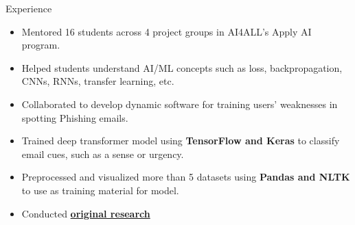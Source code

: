 \documentclass{resume} %
\begin{document}
\begin{workSection}{Experience}
    \experienceItem[
        company=AI4ALL,
        location=Remote,
        position=Student Coordinator,
        duration=August 2023 {-} December 2023
    ]
    \begin{itemize}
        \vspace{-0.5em}
        \itemsep -6pt {}
        \item Mentored 16 students across 4 project groups in AI4ALL's Apply AI program.
        \item Helped students understand AI/ML concepts such as loss, backpropagation, CNNs, RNNs, transfer learning, etc.
    \end{itemize}
    \experienceItem[
    company=UTEP,
    location=El Paso{,} TX,
    position=Volunteer Researcher,
    duration=August {-} October 2023
    ]
    \begin{itemize}
    \vspace{-0.5em}
    \itemsep -6pt {}
    \item Collaborated to develop dynamic software for training users' weaknesses in spotting Phishing emails.
    \item Trained deep transformer model using \textbf{TensorFlow and Keras} to classify email cues, such as a sense or urgency.
    \item Preprocessed and visualized more than 5 datasets using \textbf{Pandas and NLTK} to use as training material for model.
    \end{itemize}
    \experienceItem[
    company=Temple University,
    location=Philadelphia{,} PA,
    position=Undergraduate Researcher,
    duration=June {-} July 2023
    ]
    \begin{itemize}
        \vspace{-0.5em}
        \itemsep -6pt {}
        \item Conducted \href{https://dl.acm.org/doi/10.1145/3565287.3617613}{\textbf{original research} \faExternalLink} 

\end{itemize}
\end{workSection}
\end{document}
